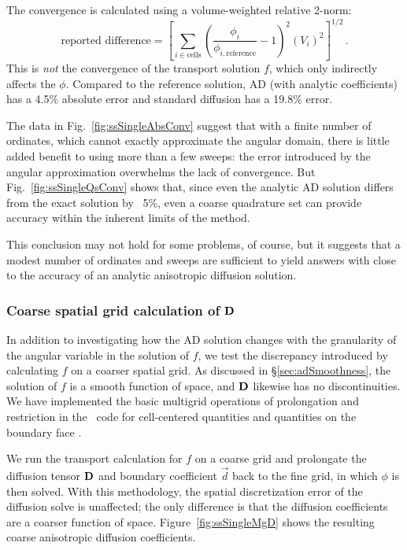 The convergence is calculated using a volume-weighted relative 2-norm:
\begin{equation}\label{eq:rel2norm}
  \text{reported difference} =
  \left[ \sum_{i \in \text{cells}} \left(
  \frac{\phi_i}{\phi_{i,\text{reference}}} - 1 \right)^2 (V_i)^2\right]^{1/2} \,.
\end{equation}
This is \emph{not} the convergence of the transport solution $f$, which only
indirectly affects the $\phi$.
Compared to the reference solution, AD (with analytic coefficients) has a 4.5\%
absolute error and standard diffusion has a 19.8\% error.

The data in Fig.~\ref{fig:ssSingleAbsConv} suggest that with a finite number of
ordinates, which cannot exactly
approximate the angular domain, there is little added benefit to using more than
a few sweeps: the error introduced by the angular approximation overwhelms
the lack of convergence. But Fig.~\ref{fig:ssSingleQsConv} shows that, since
even the analytic AD solution differs from the exact solution by ~5\%, even a
coarse quadrature set can provide accuracy within the inherent limits of the
method.

This conclusion may not hold for some problems, of course, but it suggests that
a modest number of ordinates and sweeps are sufficient to yield answers with
close to the accuracy of an analytic anisotropic diffusion solution.

\clearpage
\subsubsection{Coarse spatial grid calculation of \texorpdfstring{$\mathbf{D}$}{D}}
\label{sec:coarseGridAdCoeff}

In addition to investigating how the AD solution changes with the granularity of
the angular variable in the solution of $f$, we test the discrepancy
introduced by calculating $f$ on a coarser spatial grid. As discussed in
\S\ref{sec:adSmoothness}, the solution of $f$ is a smooth function of space, and
$\mathbf{D}$ likewise has no discontinuities. We have implemented the basic
multigrid operations of prolongation and restriction in the \pytrt\ code
for cell-centered quantities and quantities on the boundary face \cite{Pytrt}.

We run the transport calculation for $f$ on a coarse grid and prolongate the
diffusion tensor $\mathbf{D}$ and boundary coefficient $\vec{d}$ back to the fine
grid, in which $\phi$
is then solved. With this methodology, the spatial discretization error of the
diffusion solve is unaffected; the only difference is that the diffusion
coefficients are a coarser function of space. Figure~\ref{fig:ssSingleMgD} shows
the resulting coarse anisotropic diffusion coefficients.

